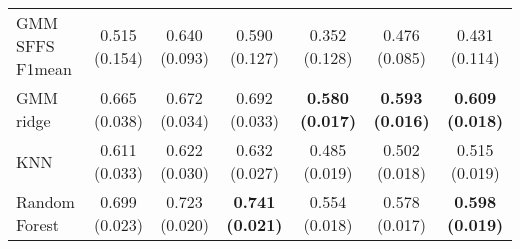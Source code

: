 \documentclass[journal,10pt,onecolumn]{IEEEtran}
\begin{document}
\begin{table}[H]
\begin{tabular}{lcccccc}
            GMM SFFS F1mean & 0.515 (0.154) & 0.640 (0.093) & 0.590 (0.127) & 0.352 (0.128) & 0.476 (0.085) & 0.431 (0.114) \\
            GMM ridge &       0.665 (0.038) & 0.672 (0.034) & 0.692 (0.033) & {\bfseries 0.580 (0.017)} & {\bfseries 0.593 (0.016)} & {\bfseries 0.609 (0.018)} \\
            KNN &             0.611 (0.033) & 0.622 (0.030) & 0.632 (0.027) & 0.485 (0.019) & 0.502 (0.018) & 0.515 (0.019) \\
            Random Forest &   0.699 (0.023) & 0.723 (0.020) & {\bfseries 0.741 (0.021)} & 0.554 (0.018) & 0.578 (0.017) & {\bfseries 0.598 (0.019)} \\
            \bottomrule
        \end{tabular}
    \end{table}
\end{document}
